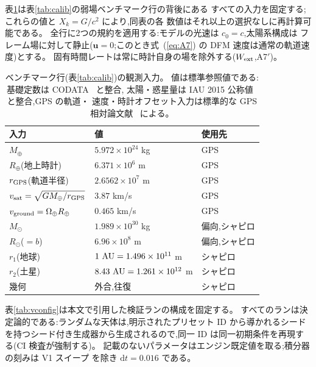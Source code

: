 \documentclass[a4paper,10pt,twocolumn]{ltjsarticle}
\newcommand{\ud}{\mathrm{d}}
\newcommand{\vect}[1]{\bm{#1}}
\newcommand{\Kt}{X_k}
\begin{document}
表\ref{tab:inputs}は表\ref{tab:calib}の弱場ベンチマーク行の背後にある
すべての入力を固定する;これらの値と $\Kt = G/c^2$ により,同表の各
数値はそれ以上の選択なしに再計算可能である。
全行に2つの規約を適用する:モデルの光速は $c_0 = c$,太陽系構成は
フレーム場に対して静止($\vect{u} = 0$;このとき式~(\ref{eq:A7}) の
DFM 速度は通常の軌道速度)とする。
固有時間レートは常に時計自身の場を除外する($W_{\rm ext}$,A7$'$)。

\begin{table}[h]
\caption{\label{tab:inputs}%
ベンチマーク行(表\ref{tab:calib})の観測入力。
値は標準参照値である:基礎定数は CODATA~\cite{CODATA2022} と整合,
太陽・惑星量は IAU 2015 公称値~\cite{Prsa2016} と整合,GPS の軌道・
速度・時計オフセット入力は標準的な GPS 相対論文献~\cite{Ashby2003}
による。}
\centering
\small
\setlength{\tabcolsep}{4pt}%
\begin{tabular}{p{}p{}p{}}
\toprule
入力 & 値 & 使用先 \\
\midrule
$M_\oplus$ & $5.972\times10^{24}$ kg & GPS \\
$R_\oplus$(地上時計) & $6.371\times10^{6}$ m & GPS \\
$r_{\rm GPS}$(軌道半径) & $2.6562\times10^{7}$ m & GPS \\
$v_{\rm sat} = \sqrt{GM_\oplus/r_{\rm GPS}}$ & $3.87$ km/s & GPS \\
$v_{\rm ground} = \Omega_\oplus R_\oplus$ & $0.465$ km/s & GPS \\
$M_\odot$ & $1.989\times10^{30}$ kg & 偏向,シャピロ \\
$R_\odot$($=b$) & $6.96\times10^{8}$ m & 偏向,シャピロ \\
$r_1$(地球) & $1\ {\rm AU} = 1.496\times10^{11}$ m & シャピロ \\
$r_2$(土星) & $8.43\ {\rm AU} = 1.261\times10^{12}$ m & シャピロ \\
幾何 & 外合,往復 & シャピロ \\
\bottomrule
\end{tabular}
\end{table}

表\ref{tab:vconfig}は本文で引用した検証ランの構成を固定する。
すべてのランは決定論的である:ランダムな天体は,明示されたプリセット
ID から導かれるシードを持つシード付き生成器から生成されるので,同一
ID は同一初期条件を再現する(CI 検査が強制する)。
記載のないパラメータはエンジン既定値を取る;積分器の刻みは V1 スイープ
を除き $\ud t = 0.016$ である。
\end{document}
